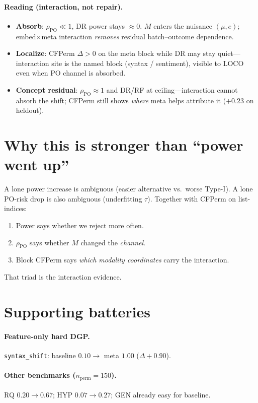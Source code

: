 \documentclass[11pt]{article}
\begin{document}
\paragraph{Reading (interaction, not repair).}
\begin{itemize}[leftmargin=*]
  \item \textbf{Absorb}: $\rho_{\mathrm{PO}}\ll 1$, DR power stays $\approx 0$.
        $M$ enters the nuisance $(\mu,e)$; embed$\times$meta interaction
        \emph{removes} residual batch--outcome dependence.
  \item \textbf{Localize}: CFPerm $\Delta>0$ on the meta block while DR may
        stay quiet---interaction site is the named block (syntax / sentiment),
        visible to LOCO even when PO channel is absorbed.
  \item \textbf{Concept residual}: $\rho_{\mathrm{PO}}\approx 1$ and DR/RF at
        ceiling---interaction cannot absorb the shift; CFPerm still shows
        \emph{where} meta helps attribute it ($+0.23$ on heldout).
\end{itemize}

\section{Why this is stronger than ``power went up''}
A lone power increase is ambiguous (easier alternative vs.\ worse Type-I).
A lone PO-risk drop is also ambiguous (underfitting $\tau$).
Together with CFPerm on list-indices:
\begin{enumerate}[leftmargin=*]
  \item Power says whether we reject more often.
  \item $\rho_{\mathrm{PO}}$ says whether $M$ changed the \emph{channel}.
  \item Block CFPerm says \emph{which modality coordinates} carry the interaction.
\end{enumerate}
That triad is the interaction evidence.

\section{Supporting batteries}
\paragraph{Feature-only hard DGP.}
\texttt{syntax\_shift}: baseline $0.10\to$ meta $1.00$ ($\Delta{+}0.90$).
\paragraph{Other benchmarks ($n_{\mathrm{perm}}{=}150$).}
RQ $0.20\to 0.67$; HYP $0.07\to 0.27$; GEN already easy for baseline.
\end{document}
